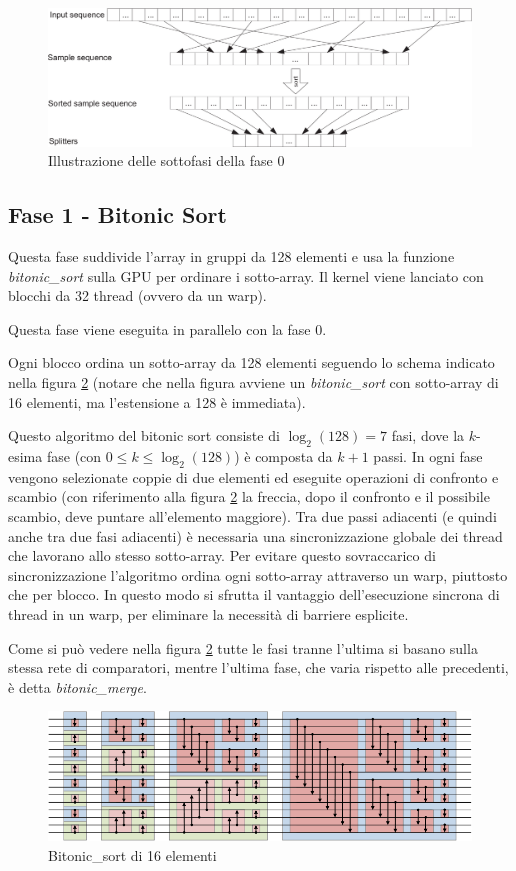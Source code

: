 \documentclass[a4paper, 11pt]{article}
\begin{document}
			\begin{figure}
				\centering
				\includegraphics[width=0.9\linewidth]{img/fase0}
				\caption{Illustrazione delle sottofasi della fase 0}
				\label{fig:fase0}
			\end{figure}
			
		\subsection{Fase 1 - Bitonic Sort}
			\label{fase1}
			Questa fase suddivide l'array in gruppi da 128 elementi e usa la funzione \emph{bitonic\_sort} sulla GPU per
			ordinare i sotto-array.
			Il kernel viene lanciato con blocchi da 32 thread (ovvero da un warp).
			
			Questa fase viene eseguita in parallelo con la fase 0.
			
			Ogni blocco ordina un sotto-array da 128 elementi seguendo lo schema indicato nella figura 
			\ref{fig:bitonicsort}
			(notare che nella figura avviene un \emph{bitonic\_sort} con sotto-array di 16 elementi, ma l'estensione a 128 è immediata).
			
			Questo algoritmo del bitonic sort consiste di $\log_2(128) = 7$ fasi, dove la $k$-esima fase (con $0 \leq k \leq \log_2(128)$) è 
			composta da $k+1$ passi.
			In ogni fase vengono selezionate coppie di due elementi ed eseguite operazioni di confronto e scambio (con riferimento alla figura
			\ref{fig:bitonicsort} la freccia, dopo il confronto e il possibile scambio, deve puntare all'elemento maggiore). 
			Tra due passi adiacenti (e quindi anche tra due fasi adiacenti) è necessaria una sincronizzazione globale dei thread che lavorano 
			allo stesso	sotto-array. 
			Per evitare questo sovraccarico di sincronizzazione l'algoritmo ordina ogni sotto-array attraverso un warp, piuttosto 
			che per blocco. In questo modo si sfrutta il vantaggio dell'esecuzione sincrona di thread in un warp, 
			per eliminare la necessità di barriere esplicite.
			
			Come si può vedere nella figura \ref{fig:bitonicsort} tutte le fasi tranne l'ultima si basano sulla stessa rete di comparatori, 
			mentre l'ultima fase, che varia rispetto alle precedenti, è detta \emph{bitonic\_merge}.
			\begin{figure}
				\centering
				\includegraphics[width=0.9\linewidth]{img/BitonicSort}
				\caption{Bitonic\_sort di 16 elementi}
				\label{fig:bitonicsort}
			\end{figure}			
\end{document}
